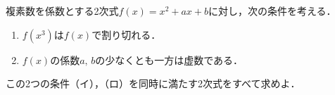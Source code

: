 \documentclass[../../main.tex]{subfiles}
\begin{document}
複素数を係数とする2次式$f(x)=x^2+ax+b$に対し，次の条件を考える．
\begin{enumerate}
  \item[（イ）]$f(x^3)$は$f(x)$で割り切れる．
  \item[（ロ）]$f(x)$の係数$a, \, b$の少なくとも一方は虚数である．
\end{enumerate}
この2つの条件（イ），（ロ）を同時に満たす2次式をすべて求めよ．
\end{document}
